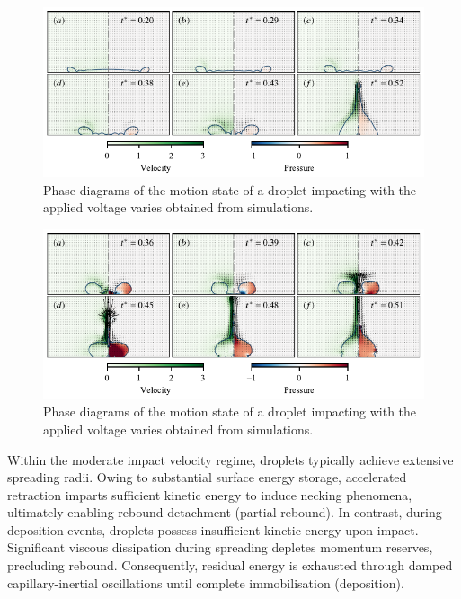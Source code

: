 \documentclass[lineno]{cls/jfm}
\begin{document}
 \begin{figure}
  \centerline{\includegraphics[width=1.0\textwidth]{fig/cojet.pdf}}
  \caption{Phase diagrams of the motion state of a droplet impacting with the applied voltage varies obtained from simulations.}
 \label{fig:cojet}
 \end{figure}

 \begin{figure}
  \centerline{\includegraphics[width=1.0\textwidth]{fig/cajet.pdf}}
  \caption{Phase diagrams of the motion state of a droplet impacting with the applied voltage varies obtained from simulations.}
 \label{fig:cajet}
 \end{figure}



 Within the moderate impact velocity regime, droplets typically achieve extensive spreading radii. Owing to substantial surface energy storage, accelerated retraction imparts sufficient kinetic energy to induce necking phenomena, ultimately enabling rebound detachment (partial rebound). In contrast, during deposition events, droplets possess insufficient kinetic energy upon impact. Significant viscous dissipation during spreading depletes momentum reserves, precluding rebound. Consequently, residual energy is exhausted through damped capillary-inertial oscillations until complete immobilisation (deposition). 
\end{document}

